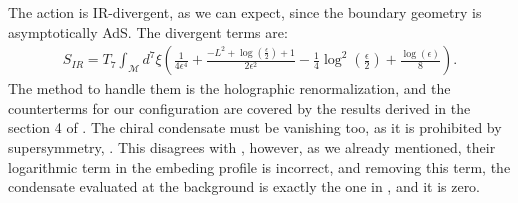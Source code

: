 The action is IR-divergent, as we can expect, since the boundary geometry is asymptotically AdS. The divergent terms are:
\begin{align}
 S_{IR} = T_7 \int_\mathcal{M} d^7\xi 
        \left( \frac{1}{4 \epsilon ^4} +\frac{-L^2+\log \left(\frac{\epsilon }{2}\right)+1}{2 \epsilon ^2}-\frac{1}{4} \log ^2\left(\frac{\epsilon }{2}\right)+\frac{\log (\epsilon )}{8} \right).
\end{align}
The method to handle them is the holographic renormalization, and the counterterms for our configuration are covered by the results derived in the section 4 of \cite{Karch:2005ms}. The chiral condensate must be vanishing too, as it is prohibited by supersymmetry, \cite{Babington:2003vm}. This disagrees with \cite{Albash:2011nw}, however, as we already mentioned, their logarithmic term in the embeding profile is incorrect, and removing this term, the condensate evaluated at the background is exactly the one in \cite{Karch:2005ms}, and it is zero.





